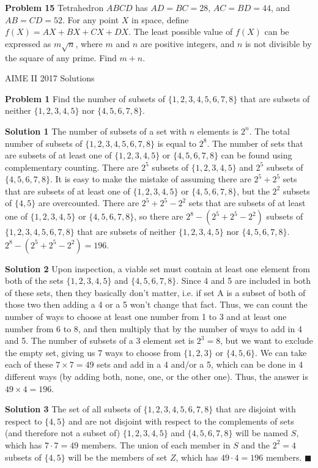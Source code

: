 \documentclass[a4paper,11pt]{article}
\begin{document}
\textbf{Problem 15}
Tetrahedron $ABCD$ has $AD=BC=28$, $AC=BD=44$, and $AB=CD=52$. For any point $X$ in space, define $f(X)=AX+BX+CX+DX$. The least possible value of $f(X)$ can be expressed as $m\sqrt{n}$, where $m$ and $n$ are positive integers, and $n$ is not divisible by the square of any prime. Find $m+n$.
\begin{center}
\begin{LARGE}
AIME II 2017 Solutions
\end{LARGE}
\end{center}
\textbf{Problem 1}
Find the number of subsets of $\{1, 2, 3, 4, 5, 6, 7, 8\}$ that are subsets of neither $\{1, 2, 3, 4, 5\}$ nor $\{4, 5, 6, 7, 8\}$.

\textbf{Solution 1}
The number of subsets of a set with $n$ elements is $2^n$. The total number of subsets of $\{1, 2, 3, 4, 5, 6, 7, 8\}$ is equal to $2^8$. The number of sets that are subsets of at least one of $\{1, 2, 3, 4, 5\}$ or $\{4, 5, 6, 7, 8\}$ can be found using complementary counting. There are $2^5$ subsets of $\{1, 2, 3, 4, 5\}$ and $2^5$ subsets of $\{4, 5, 6, 7, 8\}$. It is easy to make the mistake of assuming there are $2^5+2^5$ sets that are subsets of at least one of $\{1, 2, 3, 4, 5\}$ or $\{4, 5, 6, 7, 8\}$, but the $2^2$ subsets of $\{4, 5\}$ are overcounted. There are $2^5+2^5-2^2$ sets that are subsets of at least one of $\{1, 2, 3, 4, 5\}$ or $\{4, 5, 6, 7, 8\}$, so there are $2^8-(2^5+2^5-2^2)$ subsets of $\{1, 2, 3, 4, 5, 6, 7, 8\}$ that are subsets of neither $\{1, 2, 3, 4, 5\}$ nor $\{4, 5, 6, 7, 8\}$. $2^8-(2^5+2^5-2^2)=\boxed{196}$.

\textbf{Solution 2}
Upon inspection, a viable set must contain at least one element from both of the sets $\{1, 2, 3, 4, 5\}$ and $\{4, 5, 6, 7, 8\}$. Since 4 and 5 are included in both of these sets, then they basically don't matter, i.e. if set A is a subset of both of those two then adding a 4 or a 5 won't change that fact. Thus, we can count the number of ways to choose at least one number from 1 to 3 and at least one number from 6 to 8, and then multiply that by the number of ways to add in 4 and 5. The number of subsets of a 3 element set is $2^3=8$, but we want to exclude the empty set, giving us 7 ways to choose from  $\{1, 2, 3\}$ or $\{4, 5, 6\}$. We can take each of these $7 \times 7=49$ sets and add in a 4 and/or a 5, which can be done in 4 different ways (by adding both, none, one, or the other one). Thus, the answer is $49 \times 4=\boxed{196}$.

\textbf{Solution 3}
The set of all subsets of $\{1,2,3,4,5,6,7,8\}$ that are disjoint with respect to $\{4,5\}$ and are not disjoint with respect to the complements of sets (and therefore not a subset of) $\{1,2,3,4,5\}$ and $\{4,5,6,7,8\}$ will be named $S$, which has $7\cdot7=49$ members. The union of each member in $S$ and the $2^2=4$ subsets of $\{4,5\}$ will be the members of set $Z$, which has $49\cdot4=\boxed{196}$ members. $\blacksquare$
\end{document}
